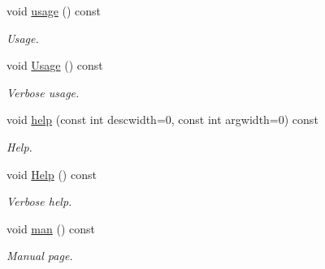 \begin{DoxyCompactItemize}
void \hyperlink{classpoptmx_1_1Option_ac23ad9ff646bbe3b58de0ed25a1c5a45}{usage} () const 
\begin{DoxyCompactList}\small\item\em Usage. \item\end{DoxyCompactList}\item 
void \hyperlink{classpoptmx_1_1Option_a612e81161856cd8d78eb43a2940d6cad}{Usage} () const 
\begin{DoxyCompactList}\small\item\em Verbose usage. \item\end{DoxyCompactList}\item 
void \hyperlink{classpoptmx_1_1Option_ac9fb1a8ec22dc1e894eb7cea2bcd8b99}{help} (const int descwidth=0, const int argwidth=0) const 
\begin{DoxyCompactList}\small\item\em Help. \item\end{DoxyCompactList}\item 
void \hyperlink{classpoptmx_1_1Option_a584b4ee29ac8923cced25b45ecf0d612}{Help} () const 
\begin{DoxyCompactList}\small\item\em Verbose help. \item\end{DoxyCompactList}\item 
void \hyperlink{classpoptmx_1_1Option_adb1487175e2002b1b5cacae51144be6e}{man} () const 
\begin{DoxyCompactList}\small\item\em Manual page. \item\end{DoxyCompactList}\end{DoxyCompactItemize}

